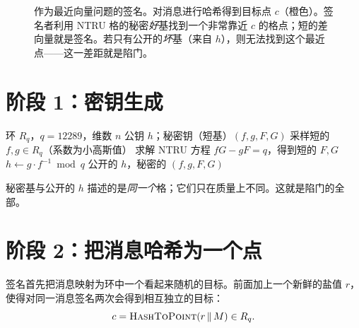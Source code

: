 \begin{figure}[H]
\centering
{}
\caption{作为最近向量问题的签名。对消息进行哈希得到目标点 $c$（橙色）。签名者利用 NTRU 格的秘密\emph{好}基找到一个非常靠近 $c$ 的格点；短的差向量就是签名。若只有公开的\emph{坏}基（来自 $h$），则无法找到这个最近点——这一差距就是陷门。}
\label{fig:falcon-cvp}
\end{figure}

\section{阶段 1：密钥生成}
\label{sec:falcon-keygen}

\begin{algorithm}[H]
\caption{FN-DSA.KeyGen（教学形式）}
\label{alg:fndsa-keygen}
\begin{algorithmic}[1]
\Require 环 $R_q$，$q=12289$，维数 $n$
\Ensure 公钥 $h$；秘密钥（短基）$(f,g,F,G)$
\Repeat
  \State 采样短的 $f, g \in R_q$（系数为小高斯值）
\State 求解 NTRU 方程 $fG - gF = q$，得到短的 $F, G$
\State $h \gets g \cdot f^{-1} \bmod q$
\State \Return 公开的 $h$，秘密的 $(f,g,F,G)$
\end{algorithmic}
\end{algorithm}

秘密基与公开的 $h$ 描述的是\emph{同一个}格；它们只在质量上不同。这就是陷门的全部。

\section{阶段 2：把消息哈希为一个点}

签名首先把消息映射为环中一个看起来随机的目标。前面加上一个新鲜的盐值 $r$，使得对同一消息签名两次会得到相互独立的目标：
\[
c = \textsc{HashToPoint}(r \,\|\, M) \in R_q.
\]

